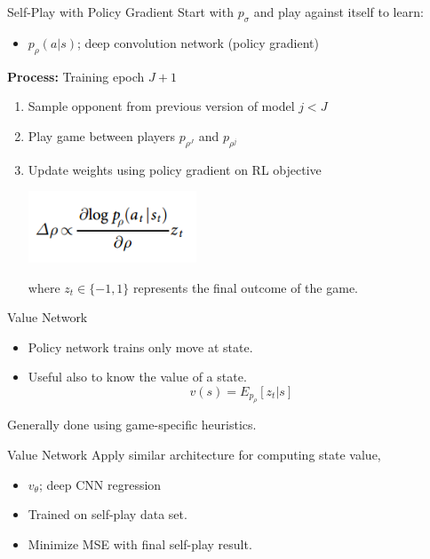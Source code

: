 \documentclass{beamer}
\begin{document}
\begin{frame}{Self-Play with Policy Gradient}
  Start with $p_{\sigma}$ and play against itself to learn:

  \begin{itemize}
  \item  $p_{\rho}(a | s)$; deep convolution network (policy gradient)
  \end{itemize}
  
  
  \textbf{Process:} Training epoch $J+1$ 
  \begin{enumerate}
  \item Sample opponent from previous version of model $j <J$
  \item Play game between players $p_{\rho^J}$ and $p_{\rho^j}$ 
  \item Update weights using policy gradient on RL objective
    \begin{center}
      \includegraphics[width=5cm]{alphago/update}
    \end{center}
    where $z_t \in \{-1, 1\}$ represents the final outcome of the game.
  \end{enumerate}
\end{frame}

\begin{frame}{Value Network}
  \begin{itemize}
  \item Policy network trains only move at state.
  \item Useful also to know the value of a state. 
    \[ v(s) = E_{p_{\rho}}[z_t | s] \] 
  \end{itemize}
  \air 

  Generally done using game-specific heuristics.
\end{frame}

\begin{frame}{Value Network}
  Apply similar architecture for computing state value,

  \begin{itemize}
  \item $v_{\theta}$; deep CNN regression
    \air 
  \item Trained on self-play data set.
    \air 
  \item Minimize MSE with final self-play result.
  \end{itemize}
\end{frame}
\end{document}
